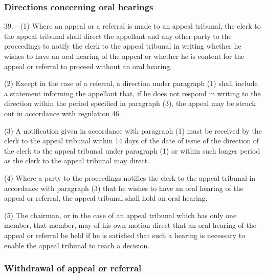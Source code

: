 \documentclass[12pt,a4paper]{article}
\begin{document}

\subsubsection[39. Directions concerning oral hearings]{Directions concerning oral hearings}

39.—(1) Where an appeal or a referral is made to an appeal tribunal, the clerk to the appeal tribunal shall direct the appellant and any other party to the proceedings to notify the clerk to the appeal tribunal in writing whether he wishes to have an oral hearing of the appeal or whether he is content for the appeal or referral to proceed without an oral hearing.

(2) Except in the case of a referral, a direction under paragraph (1) shall include a statement informing the appellant that, if he does not respond in writing to the direction within the period specified in paragraph (3), the appeal may be struck out in accordance with regulation 46.

(3) A notification given in accordance with paragraph (1) must be received by the clerk to the appeal tribunal within 14 days of the date of issue of the direction of the clerk to the appeal tribunal under paragraph (1) or within such longer period as the clerk to the appeal tribunal may direct.

(4) Where a party to the proceedings notifies the clerk to the appeal tribunal in accordance with paragraph (3) that he wishes to have an oral hearing of the appeal or referral, the appeal tribunal shall hold an oral hearing.

(5) The chairman, or in the case of an appeal tribunal which has only one member, that member, may of his own motion direct that an oral hearing of the appeal or referral be held if he is satisfied that such a hearing is necessary to enable the appeal tribunal to reach a decision.

\subsubsection[40. Withdrawal of appeal or referral]{Withdrawal of appeal or referral}
\end{document}
